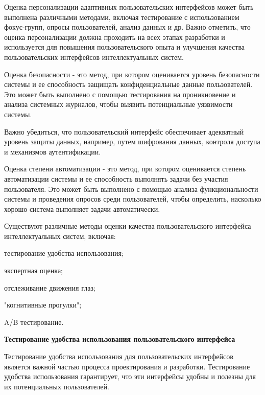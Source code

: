 \begin{textitemize}
	Оценка персонализации адаптивных пользовательских интерфейсов может быть выполнена различными методами, включая тестирование с использованием фокус-групп, опросы пользователей, анализ данных и др.
	Важно отметить, что оценка персонализации должна проходить на всех этапах разработки и используется для повышения пользовательского опыта и улучшения качества пользовательских интерфейсов интеллектуальных систем.
	\item Оценка безопасности - это метод, при котором оценивается уровень безопасности системы и ее способность защищать конфиденциальные данные пользователей. Это может быть выполнено с помощью тестирования на проникновение и анализа системных журналов, чтобы выявить потенциальные уязвимости системы.
	
	Важно убедиться, что пользовательский интерфейс обеспечивает адекватный уровень защиты данных, например, путем шифрования данных, контроля доступа и механизмов аутентификации.
	\item Оценка степени автоматизации - это метод, при котором оценивается степень автоматизации системы и ее способность выполнять задачи без участия пользователя. Это может быть выполнено с помощью анализа функциональности системы и проведения опросов среди пользователей, чтобы определить, насколько хорошо система выполняет задачи автоматически.
\end{textitemize}










Существуют различные методы оценки качества пользовательского интерфейса интеллектуальных систем, включая:
\begin{textitemize}
	\item тестирование удобства использования;
	\item экспертная оценка;
	\item отслеживание движения глаз;
	\item "когнитивные прогулки";
	\item A/B тестирование.
\end{textitemize}

\textbf{Тестирование удобства использования пользовательского интерфейса} 

Тестирование удобства использования для пользовательских интерфейсов является важной частью процесса проектирования и разработки. Тестирование удобства использования гарантирует, что эти интерфейсы удобны и полезны для их потенциальных пользователей.

